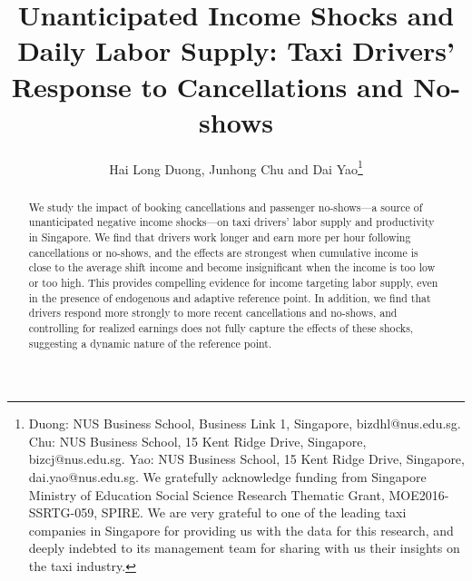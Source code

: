 \documentclass[reviewmode,AEJ]{AEA}
\begin{document}

\pagestyle{empty}

\title{Unanticipated Income Shocks and Daily Labor Supply: Taxi Drivers' Response to Cancellations and No-shows}
\author{Hai Long Duong, Junhong Chu and Dai Yao\thanks{Duong: NUS Business School, Business Link 1, Singapore, bizdhl@nus.edu.sg. Chu: NUS Business School, 15 Kent Ridge Drive, Singapore, bizcj@nus.edu.sg. Yao: NUS Business School, 15 Kent Ridge Drive, Singapore, dai.yao@nus.edu.sg. We gratefully acknowledge funding from Singapore Ministry of Education Social Science Research Thematic Grant, MOE2016-SSRTG-059, SPIRE. We are very grateful to one of the leading taxi companies in Singapore for providing us with the data for this research, and deeply indebted to its management team for sharing with us their insights on the taxi industry.}}


\begin{abstract}
	We study the impact of booking cancellations and passenger no-shows---a source of unanticipated negative 
	income shocks---on taxi drivers' labor supply and productivity in Singapore. We find that 
	drivers work longer and earn more per hour following cancellations or no-shows, and the 
    effects are strongest when cumulative income is close to the average shift income and become 
    insignificant when the income is too low or too high. This provides 
	compelling evidence for income targeting labor supply, even in the presence of endogenous and adaptive 
	reference point. In addition, we find that drivers respond more strongly to more recent 
	cancellations and no-shows, and controlling for realized earnings does not fully capture the effects of these shocks,
	suggesting a dynamic nature of the reference point. 
\end{abstract}

\maketitle


\newpage
\end{document}
